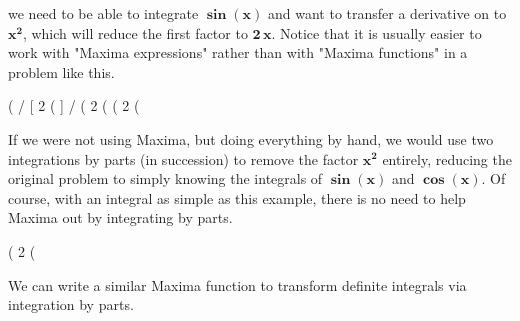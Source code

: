 \documentclass[12pt]{article}
\newcommand{\tcbr}{\textcolor{BrickRed}}
\begin{document}
 we need to be able to integrate $\boldsymbol{\sin(x)}$ and want to
  transfer a derivative on to $\mathbf{x^2}$, which will reduce the first factor to $\mathbf{2\,x}$.
Notice that it is usually easier to work with "Maxima expressions" rather than
  with "Maxima functions" in a problem like this.
\begin{myVerbatim}
(%
                            /
                            [                2
(%
                            ]
                            /
(%
                                     2
(%
(%
                                            2
(%
\end{myVerbatim} 
If we were not using Maxima, but doing everything by hand, we would use two
  integrations by parts (in succession) to remove the factor $\mathbf{x^{2}}$ entirely,
  reducing the original problem to simply knowing the integrals of $\boldsymbol{\sin(x)}$
  and $\boldsymbol{\cos(x)}$. 
\newpage
\noindent Of course, with an integral as simple as this example, there is no need to
  help Maxima out by integrating by parts.
\begin{myVerbatim}
(%
                                            2
(%
\end{myVerbatim} 
We can write a similar Maxima function to transform \tcbr{definite integrals} via
  integration by parts.
\vspace{4cm}
\end{document}
